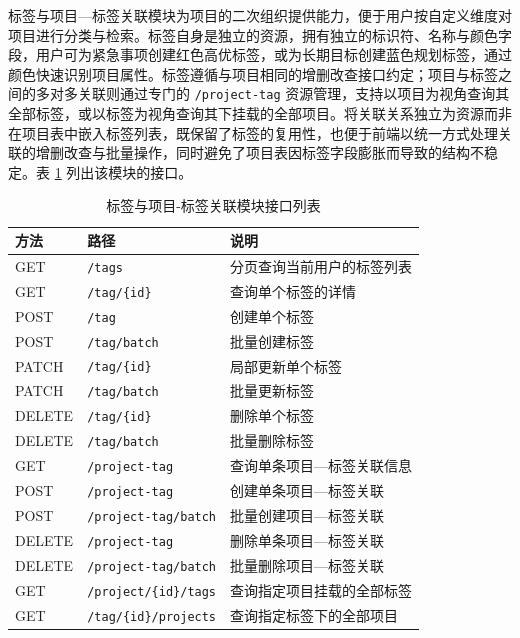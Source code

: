 \par 标签与项目—标签关联模块为项目的二次组织提供能力，便于用户按自定义维度对项目进行分类与检索。标签自身是独立的资源，拥有独立的标识符、名称与颜色字段，用户可为紧急事项创建红色高优标签，或为长期目标创建蓝色规划标签，通过颜色快速识别项目属性。标签遵循与项目相同的增删改查接口约定；项目与标签之间的多对多关联则通过专门的 \texttt{/project-tag} 资源管理，支持以项目为视角查询其全部标签，或以标签为视角查询其下挂载的全部项目。将关联关系独立为资源而非在项目表中嵌入标签列表，既保留了标签的复用性，也便于前端以统一方式处理关联的增删改查与批量操作，同时避免了项目表因标签字段膨胀而导致的结构不稳定。表 \ref{tab:api-tag} 列出该模块的接口。

\begin{table}[htbp]
  \centering
  \caption{标签与项目-标签关联模块接口列表}
  \label{tab:api-tag}
  \begin{tabular}{p{2cm}p{5cm}p{6cm}}
    \hline
    方法 & 路径 & 说明 \\
    \hline
    GET & \texttt{/tags} & 分页查询当前用户的标签列表 \\
    GET & \texttt{/tag/\{id\}} & 查询单个标签的详情 \\
    POST & \texttt{/tag} & 创建单个标签 \\
    POST & \texttt{/tag/batch} & 批量创建标签 \\
    PATCH & \texttt{/tag/\{id\}} & 局部更新单个标签 \\
    PATCH & \texttt{/tag/batch} & 批量更新标签 \\
    DELETE & \texttt{/tag/\{id\}} & 删除单个标签 \\
    DELETE & \texttt{/tag/batch} & 批量删除标签 \\
    GET & \texttt{/project-tag} & 查询单条项目—标签关联信息 \\
    POST & \texttt{/project-tag} & 创建单条项目—标签关联 \\
    POST & \texttt{/project-tag/batch} & 批量创建项目—标签关联 \\
    DELETE & \texttt{/project-tag} & 删除单条项目—标签关联 \\
    DELETE & \texttt{/project-tag/batch} & 批量删除项目—标签关联 \\
    GET & \texttt{/project/\{id\}/tags} & 查询指定项目挂载的全部标签 \\
    GET & \texttt{/tag/\{id\}/projects} & 查询指定标签下的全部项目 \\
    \hline
  \end{tabular}
\end{table}

